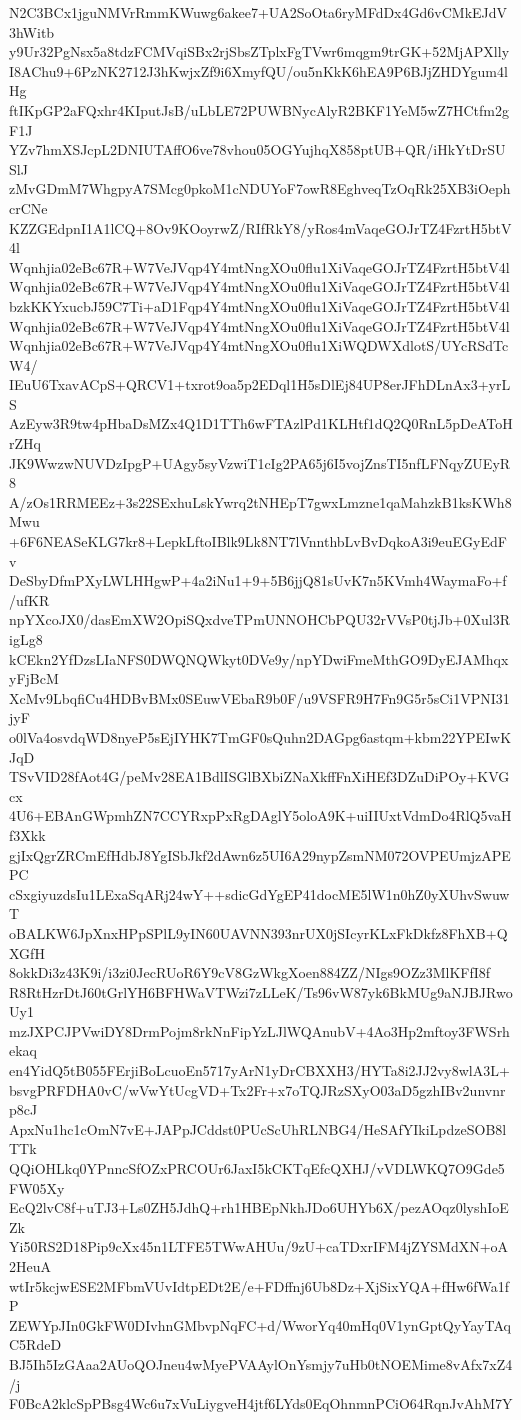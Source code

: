 N2C3BCx1jguNMVrRmmKWuwg6akee7+UA2SoOta6ryMFdDx4Gd6vCMkEJdV3hWitb
y9Ur32PgNsx5a8tdzFCMVqiSBx2rjSbsZTplxFgTVwr6mqgm9trGK+52MjAPXlly
I8AChu9+6PzNK2712J3hKwjxZf9i6XmyfQU/ou5nKkK6hEA9P6BJjZHDYgum4lHg
ftIKpGP2aFQxhr4KIputJsB/uLbLE72PUWBNycAlyR2BKF1YeM5wZ7HCtfm2gF1J
YZv7hmXSJcpL2DNIUTAffO6ve78vhou05OGYujhqX858ptUB+QR/iHkYtDrSUSlJ
zMvGDmM7WhgpyA7SMcg0pkoM1cNDUYoF7owR8EghveqTzOqRk25XB3iOephcrCNe
KZZGEdpnI1A1lCQ+8Ov9KOoyrwZ/RIfRkY8/yRos4mVaqeGOJrTZ4FzrtH5btV4l
Wqnhjia02eBc67R+W7VeJVqp4Y4mtNngXOu0flu1XiVaqeGOJrTZ4FzrtH5btV4l
Wqnhjia02eBc67R+W7VeJVqp4Y4mtNngXOu0flu1XiVaqeGOJrTZ4FzrtH5btV4l
bzkKKYxucbJ59C7Ti+aD1Fqp4Y4mtNngXOu0flu1XiVaqeGOJrTZ4FzrtH5btV4l
Wqnhjia02eBc67R+W7VeJVqp4Y4mtNngXOu0flu1XiVaqeGOJrTZ4FzrtH5btV4l
Wqnhjia02eBc67R+W7VeJVqp4Y4mtNngXOu0flu1XiWQDWXdlotS/UYcRSdTcW4/
IEuU6TxavACpS+QRCV1+txrot9oa5p2EDql1H5sDlEj84UP8erJFhDLnAx3+yrLS
AzEyw3R9tw4pHbaDsMZx4Q1D1TTh6wFTAzlPd1KLHtf1dQ2Q0RnL5pDeAToHrZHq
JK9WwzwNUVDzIpgP+UAgy5syVzwiT1cIg2PA65j6I5vojZnsTI5nfLFNqyZUEyR8
A/zOs1RRMEEz+3s22SExhuLskYwrq2tNHEpT7gwxLmzne1qaMahzkB1ksKWh8Mwu
+6F6NEASeKLG7kr8+LepkLftoIBlk9Lk8NT7lVnnthbLvBvDqkoA3i9euEGyEdFv
DeSbyDfmPXyLWLHHgwP+4a2iNu1+9+5B6jjQ81sUvK7n5KVmh4WaymaFo+f/ufKR
npYXcoJX0/dasEmXW2OpiSQxdveTPmUNNOHCbPQU32rVVsP0tjJb+0Xul3RigLg8
kCEkn2YfDzsLIaNFS0DWQNQWkyt0DVe9y/npYDwiFmeMthGO9DyEJAMhqxyFjBcM
XcMv9LbqfiCu4HDBvBMx0SEuwVEbaR9b0F/u9VSFR9H7Fn9G5r5sCi1VPNI31jyF
o0lVa4osvdqWD8nyeP5sEjIYHK7TmGF0sQuhn2DAGpg6astqm+kbm22YPEIwKJqD
TSvVID28fAot4G/peMv28EA1BdlISGlBXbiZNaXkffFnXiHEf3DZuDiPOy+KVGcx
4U6+EBAnGWpmhZN7CCYRxpPxRgDAglY5oloA9K+uiIIUxtVdmDo4RlQ5vaHf3Xkk
gjIxQgrZRCmEfHdbJ8YgISbJkf2dAwn6z5UI6A29nypZsmNM072OVPEUmjzAPEPC
cSxgiyuzdsIu1LExaSqARj24wY++sdicGdYgEP41docME5lW1n0hZ0yXUhvSwuwT
oBALKW6JpXnxHPpSPlL9yIN60UAVNN393nrUX0jSIcyrKLxFkDkfz8FhXB+QXGfH
8okkDi3z43K9i/i3zi0JecRUoR6Y9cV8GzWkgXoen884ZZ/NIgs9OZz3MlKFfI8f
R8RtHzrDtJ60tGrlYH6BFHWaVTWzi7zLLeK/Ts96vW87yk6BkMUg9aNJBJRwoUy1
mzJXPCJPVwiDY8DrmPojm8rkNnFipYzLJlWQAnubV+4Ao3Hp2mftoy3FWSrhekaq
en4YidQ5tB055FErjiBoLcuoEn5717yArN1yDrCBXXH3/HYTa8i2JJ2vy8wlA3L+
bsvgPRFDHA0vC/wVwYtUcgVD+Tx2Fr+x7oTQJRzSXyO03aD5gzhIBv2unvnrp8cJ
ApxNu1hc1cOmN7vE+JAPpJCddst0PUcScUhRLNBG4/HeSAfYIkiLpdzeSOB8lTTk
QQiOHLkq0YPnncSfOZxPRCOUr6JaxI5kCKTqEfcQXHJ/vVDLWKQ7O9Gde5FW05Xy
EcQ2lvC8f+uTJ3+Ls0ZH5JdhQ+rh1HBEpNkhJDo6UHYb6X/pezAOqz0lyshIoEZk
Yi50RS2D18Pip9cXx45n1LTFE5TWwAHUu/9zU+caTDxrIFM4jZYSMdXN+oA2HeuA
wtIr5kcjwESE2MFbmVUvIdtpEDt2E/e+FDffnj6Ub8Dz+XjSixYQA+fHw6fWa1fP
ZEWYpJIn0GkFW0DIvhnGMbvpNqFC+d/WworYq40mHq0V1ynGptQyYayTAqC5RdeD
BJ5Ih5IzGAaa2AUoQOJneu4wMyePVAAylOnYsmjy7uHb0tNOEMime8vAfx7xZ4/j
F0BcA2klcSpPBsg4Wc6u7xVuLiygveH4jtf6LYds0EqOhnmnPCiO64RqnJvAhM7Y
